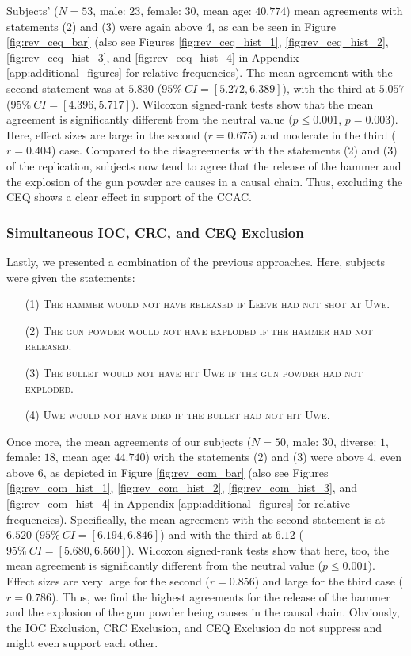 \documentclass[egregdoesnotlikesansseriftitles,12pt]{scrartcl}
\begin{document}
\noindent Subjects' ($N=53$, male: $23$, female: $30$, mean age: $40.774$) mean agreements with statements (2) and (3) were again above 4, as can be seen in Figure \ref{fig:rev_ceq_bar} (also see Figures \ref{fig:rev_ceq_hist_1}, \ref{fig:rev_ceq_hist_2}, \ref{fig:rev_ceq_hist_3}, and \ref{fig:rev_ceq_hist_4} in Appendix \ref{app:additional_figures} for relative frequencies). The mean agreement with the second statement was at $5.830$ ($95\%~CI=[5.272,6.389]$), with the third at $5.057$ ($95\%~CI=[4.396,5.717]$). Wilcoxon signed-rank tests show that the mean agreement is significantly different from the neutral value ($p \leq 0.001$, $p=0.003$). Here, effect sizes are large in the second ($r=0.675$) and moderate in the third ($r=0.404$) case. Compared to the disagreements with the statements (2) and (3) of the replication, subjects now tend to agree that the release of the hammer and the explosion of the gun powder are causes in a causal chain. Thus, excluding the CEQ shows a clear effect in support of the CCAC.

\subsubsection{Simultaneous IOC, CRC, and CEQ Exclusion}\label{sec:results_rev_com}
Lastly, we presented a combination of the previous approaches. Here, subjects were given the statements:

\begin{itemize}
   \item[(1)]\textsc{The hammer would not have released if Leeve had not shot at Uwe.}
   \item[(2)]\textsc{The gun powder would not have exploded if the hammer had not released.}
   \item[(3)]\textsc{The bullet would not have hit Uwe if the gun powder had not exploded.}
   \item[(4)]\textsc{Uwe would not have died if the bullet had not hit Uwe.}
\end{itemize}

\noindent Once more, the mean agreements of our subjects ($N=50$, male: $30$, diverse: $1$, female: $18$, mean age: $44.740$) with the statements (2) and (3) were above $4$, even above $6$, as depicted in Figure \ref{fig:rev_com_bar} (also see Figures \ref{fig:rev_com_hist_1}, \ref{fig:rev_com_hist_2}, \ref{fig:rev_com_hist_3}, and \ref{fig:rev_com_hist_4} in Appendix \ref{app:additional_figures} for relative frequencies). Specifically, the mean agreement with the second statement is at $6.520$ ($95\%~CI=[6.194,6.846]$) and with the third at $6.12$ ($95\%~CI=[5.680,6.560]$). Wilcoxon signed-rank tests show that here, too, the mean agreement is significantly different from the neutral value ($p \leq 0.001$). Effect sizes are very large for the second ($r=0.856$) and large for the third case ($r=0.786$). Thus, we find the highest agreements for the release of the hammer and the explosion of the gun powder being causes in the causal chain. Obviously, the IOC Exclusion, CRC Exclusion, and CEQ Exclusion do not suppress and might even support each other.
\end{document}
